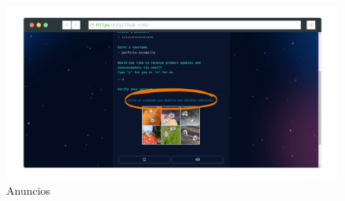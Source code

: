 \begin{figure}[H]
    \centering
    \includegraphics[width=\paperwidth-12cm]{screenshot-rocks-GitHub-Verificacion-Instrucciones-Resalte.png}
    \caption{Anuncios}
\end{figure}